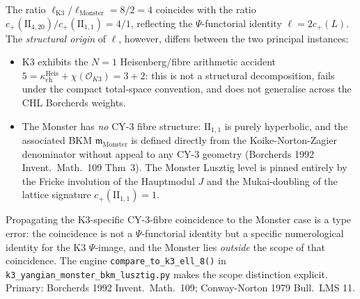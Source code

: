 \begin{remark}[Structural distinction K3 vs.\ Monster: CY-3 coincidence is \texorpdfstring{$N = 1$}{N = 1}]
\label{rem:k3ebkm-witten-k3-monster-cy3-coincidence}
The ratio $\ell_{\mathrm{K3}}/\ell_{\mathrm{Monster}} = 8/2 = 4$
coincides with the ratio
$c_+(\mathrm{II}_{4,20})/c_+(\mathrm{II}_{1,1}) = 4/1$, reflecting
the $\Psi$-functorial identity $\ell = 2c_+(L)$. The \emph{structural
origin} of $\ell$, however, differs between the two principal instances:
\begin{itemize}
\item K3 exhibits the $N = 1$ Heisenberg/fibre arithmetic accident
 $5 = \kappa_{\mathrm{ch}}^{\mathrm{Heis}} + \chi(\mathcal{O}_{K3}) = 3+2$:
 this is not a structural decomposition, fails under the compact
 total-space convention, and does not generalise across the CHL
 Borcherds weights.
\item The Monster has \emph{no} CY-3 fibre structure: $\mathrm{II}_{1,1}$
 is purely hyperbolic, and the associated BKM
 $\mathfrak m_{\mathrm{Monster}}$ is defined directly from the
 Koike-Norton-Zagier denominator without appeal to any CY-3 geometry
 (Borcherds 1992 Invent.\ Math.~109 Thm~3). The Monster Lusztig level
 is pinned entirely by the Fricke involution of the Hauptmodul $J$
 and the Mukai-doubling of the lattice signature
 $c_+(\mathrm{II}_{1,1}) = 1$.
\end{itemize}
Propagating the K3-specific CY-3-fibre coincidence to the Monster
case is a type error: the coincidence is not a
$\Psi$-functorial identity but a specific numerological identity
for the K3 $\Psi$-image, and the Monster lies \emph{outside} the
scope of that coincidence. The engine
\texttt{compare\_to\_k3\_ell\_8()} in
\texttt{k3\_yangian\_monster\_bkm\_lusztig.py} makes the scope
distinction explicit. Primary: Borcherds 1992 Invent.\ Math.~109;
Conway-Norton 1979 Bull.\ LMS 11.
\end{remark}

